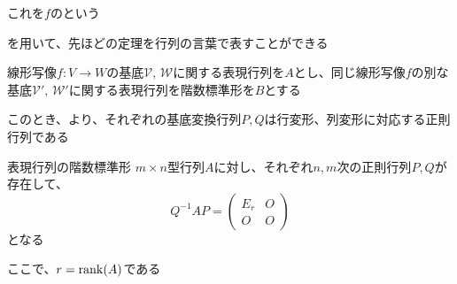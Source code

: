 \documentclass[../../../topic_linear-algebra]{subfiles}
\begin{document}
これを$f$のという

\sectionline

を用いて、先ほどの定理を行列の言葉で表すことができる

\br

線形写像$f\colon V \to W$の基底$\mathcal{V},\, \mathcal{W}$に関する表現行列を$A$とし、同じ線形写像$f$の別な基底$\mathcal{V}',\, \mathcal{W}'$に関する表現行列を階数標準形を$B$とする

このとき、より、それぞれの基底変換行列$P,Q$は行変形、列変形に対応する正則行列である

\begin{theorem*}{表現行列の階数標準形}
  $m\times n$型行列$A$に対し、それぞれ$n,m$次の正則行列$P,Q$が存在して、
  \begin{equation*}
    Q^{-1} A P = \begin{pmatrix}
      E_r & O \\
      O   & O
    \end{pmatrix}
  \end{equation*}
  となる

  ここで、$r = \rank(A)$である
\end{theorem*}
\end{document}
